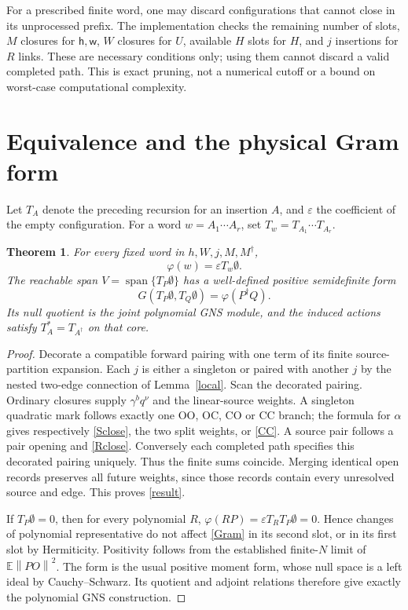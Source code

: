 \documentclass[11pt]{article}
\newcommand{\E}{\mathbb E}
\newcommand{\norm}[1]{\left\lVert#1\right\rVert}
\newtheorem{theorem}{Theorem}
\begin{document}
For a prescribed finite word, one may discard configurations that
cannot close in its unprocessed prefix. The implementation checks the
remaining number of slots, $M$ closures for $\mathsf h,\mathsf w$,
$W$ closures for $U$, available $H$ slots for $H$, and $j$ insertions
for $R$ links. These are necessary conditions only; using them cannot
discard a valid completed path. This is exact pruning, not a numerical
cutoff or a bound on worst-case computational complexity.

\newpage
\section{Equivalence and the physical Gram form}
Let $T_A$ denote the preceding recursion for an insertion $A$, and
$\varepsilon$ the coefficient of the empty configuration. For a word
$w=A_1\cdots A_r$, set $T_w=T_{A_1}\cdots T_{A_r}$.
\begin{theorem}
For every fixed word in $h,W,j,M,M^\dagger$,
\begin{equation}\label{result}
 \varphi(w)=\varepsilon T_w\emptyset .
\end{equation}
The reachable span $V=\operatorname{span}\{T_P\emptyset\}$ has a
well-defined positive semidefinite form
\begin{equation}\label{Gram}
 G(T_P\emptyset,T_Q\emptyset)=\varphi(P^\dagger Q).
\end{equation}
Its null quotient is the joint polynomial GNS module, and the induced
actions satisfy $T_A^*=T_{A^\dagger}$ on that core.
\end{theorem}
\begin{proof}
Decorate a compatible forward pairing with one term of its finite
source-partition expansion. Each $j$ is either a singleton or paired
with another $j$ by the nested two-edge connection of Lemma~\ref{local}.
Scan the decorated pairing. Ordinary closures supply
$\gamma^bq^\nu$ and the linear-source weights. A singleton quadratic
mark follows exactly one OO, OC, CO or CC branch; the formula for
$\alpha$ gives respectively \eqref{Sclose}, the two split weights,
or \eqref{CC}. A source pair follows a pair opening and \eqref{Rclose}.
Conversely each completed path specifies this decorated pairing
uniquely. Thus the finite sums coincide. Merging identical open records
preserves all future weights, since those records contain every
unresolved source and edge. This proves \eqref{result}.

If $T_P\emptyset=0$, then for every polynomial $R$,
$\varphi(RP)=\varepsilon T_RT_P\emptyset=0$. Hence changes of
polynomial representative do not affect \eqref{Gram} in its second
slot, or in its first slot by Hermiticity. Positivity follows from the
established finite-$N$ limit of $\E\norm{P O}^2$. The form is the usual
positive moment form, whose null space is a left ideal by
Cauchy--Schwarz. Its quotient and adjoint relations therefore give
exactly the polynomial GNS construction.
\end{proof}
\end{document}
